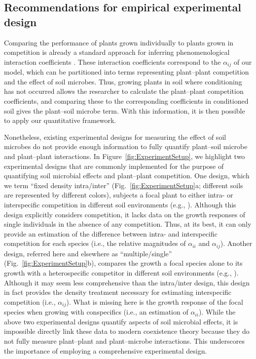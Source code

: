 \subsection{Recommendations for empirical experimental design}
Comparing the performance of plants grown individually to plants grown in competition is already a standard approach for inferring phenomenological interaction coefficients \citep{Hart2018}. These interaction coefficients correspond to the $\alpha_{ij}$ of our model, which can be partitioned into terms representing plant--plant competition and the effect of soil microbes. Thus, growing plants in soil where conditioning has not occurred allows the researcher to calculate the plant--plant competition coefficients, and comparing these to the corresponding coefficients in conditioned soil gives the plant--soil microbe term. With this information, it is then possible to apply our quantitative framework.
\par


Nonetheless, existing experimental designs for measuring the effect of soil microbes do not provide enough information to fully quantify plant--soil microbe and plant--plant interactions.
In Figure~\ref{fig:ExperimentSetup}, we highlight two experimental designs that are commonly implemented for the purpose of quantifying soil microbial effects and plant--plant competition.
One design, which we term ``fixed density intra/inter'' (Fig.~\ref{fig:ExperimentSetup}a; different soils are represented by different colors), subjects a focal plant to either intra- or interspecific competition in different soil environments (e.g., \citealt{Aguilera2017, Petermann2008}). Although this design explicitly considers competition, it lacks data on the growth responses of single individuals in the absence of any competition. Thus, at its best, it can only provide an estimation of the difference between intra- and interspecific competition for each species (i.e., the relative magnitudes of $\alpha_{ii}$ and $\alpha_{ij}$).
Another design, referred here and elsewhere as ``multiple/single''  (Fig.~\ref{fig:ExperimentSetup}b), compares the growth a focal species alone to its growth with a heterospecific competitor in different soil environments (e.g., \citealt{Shannon2012, Crawford2017}). Although it may seem less comprehensive than the intra/inter design, this design in fact provides the density treatment necessary for estimating interspecific competition (i.e., $\alpha_{ij}$). What is missing here is the growth response of the focal species when growing with conspecifics (i.e., an estimation of $\alpha_{ii}$).
While the above two experimental designs quantify aspects of soil microbial effects, it is impossible directly link these data to modern coexistence theory because they do not fully measure plant--plant and plant--microbe interactions. This underscores the importance of employing a comprehensive experimental design.
\par


